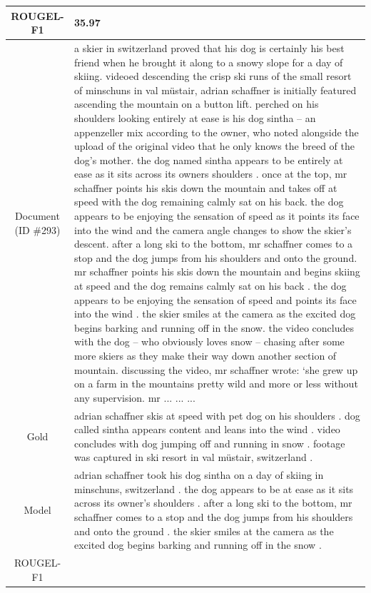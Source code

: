 \begin{table}[bth!]
\begin{tabular}{c|p{}}
\\ \hline
ROUGEL-F1 & 
35.97
\\ \hline
\makecell{Document\\(ID \#293)} & 
a skier in switzerland proved that his dog is certainly his best friend when he brought it along to a snowy slope for a day of skiing. videoed descending the crisp ski runs of the small resort of minschuns in val müstair, adrian schaffner is initially featured ascending the mountain on a button lift. perched on his shoulders looking entirely at ease is his dog sintha – an appenzeller mix according to the owner, who noted alongside the upload of the original video that he only knows the breed of the dog's mother. the dog named sintha appears to be entirely at ease as it sits across its owners shoulders . once at the top, mr schaffner points his skis down the mountain and takes off at speed with the dog remaining calmly sat on his back. the dog appears to be enjoying the sensation of speed as it points its face into the wind and the camera angle changes to show the skier’s descent. after a long ski to the bottom, mr schaffner comes to a stop and the dog jumps from his shoulders and onto the ground. mr schaffner points his skis down the mountain and begins skiing at speed and the dog remains calmly sat on his back . the dog appears to be enjoying the sensation of speed and points its face into the wind . the skier smiles at the camera as the excited dog begins barking and running off in the snow. the video concludes with the dog – who obviously loves snow – chasing after some more skiers as they make their way down another section of mountain. discussing the video, mr schaffner wrote: ‘she grew up on a farm in the mountains pretty wild and more or less without any supervision. mr ... ... ... 
\\ \hline
Gold & 
adrian schaffner skis at speed with pet dog on his shoulders . dog called sintha appears content and leans into the wind . video concludes with dog jumping off and running in snow . footage was captured in ski resort in val müstair, switzerland .
\\ \hline
Model & 
adrian schaffner took his dog sintha on a day of skiing in minschuns, switzerland . the dog appears to be at ease as it sits across its owner's shoulders . after a long ski to the bottom, mr schaffner comes to a stop and the dog jumps from his shoulders and onto the ground . the skier smiles at the camera as the excited dog begins barking and running off in the snow .
\\ \hline
ROUGEL-F1 & 

\end{tabular}
\end{table}
